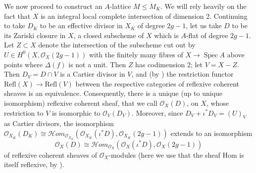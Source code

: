 \documentclass{article} %
\numberwithin{equation}{section}
\DeclareMathOperator{\Spec}{Spec}
\newcommand{\cO}{\mathcal{O}}
\newcommand{\ShHom}{\mathcal{H}\!\mathit{om}}
\begin{document}
We now proceed to construct an $A$-lattice $M \leq M_K$. We will rely heavily on the fact that $X$ is an integral local complete intersection of dimension 2. Continuing to take $D_K$ to be an effective divisor in $X_K$ of degree $2g-1$, let us take $D$ to be its Zariski closure in $X$, a closed subscheme of $X$ which is $A$-flat of degree $2g-1$. Let $Z \subset X$ denote the intersection of the subscheme cut out by $U \in H^0(X, \cO_X(2g-1))$ with the finitely many fibres of $X \to \Spec A$ above points where $\Delta(f)$ is not a unit. Then $Z$ has codimension 2; let $V = X - Z$. Then $D_V = D \cap V$ is a Cartier divisor in $V$, and (by \cite[Theorem 1.12]{Har92}) the restriction functor $\mathrm{Refl}(X) \to \mathrm{Refl}(V)$ between the respective categories of reflexive coherent sheaves is an equivalence. 
Consequently, there is a unique (up to unique isomorphism) reflexive coherent sheaf, that we call $\cO_X(D)$, on $X$, whose restriction to $V$ is isomorphic to $\cO_V(D_V)$. Moreover, since $D_V + \iota^\ast D_V = (U)_V$ as Cartier divisors, the isomorphism $\cO_{X_K}(D_K) \cong \ShHom_{\cO_{X_K}}(\cO_{X_K}(\iota^\ast D), \cO_{X_K}(2g-1))$ extends to an isomorphism 
\begin{equation}\label{eqn_pairing_of_sheaves_on_X} \cO_X(D) \cong \ShHom_{\cO_X}(\cO_X(\iota^\ast D), \cO_X(2g-1)) 
\end{equation}
of reflexive coherent sheaves of $\cO_X$-modules (here we use that the sheaf Hom is itself reflexive, by \cite[Corollary 1.18]{Har92}). 
\end{document}
